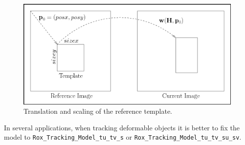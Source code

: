 \begin{figure}[htbp] 
\begin{center}
\includegraphics[width=1.0\textwidth]{tracking/figures/scale}
\caption{Translation and scaling of the reference template.}
\label{scale}
\end{center}
\end{figure}

In several applications, when tracking deformable objects it is better to fix the model to \lstinline$Rox_Tracking_Model_tu_tv_s$ or \lstinline$Rox_Tracking_Model_tu_tv_su_sv$.



